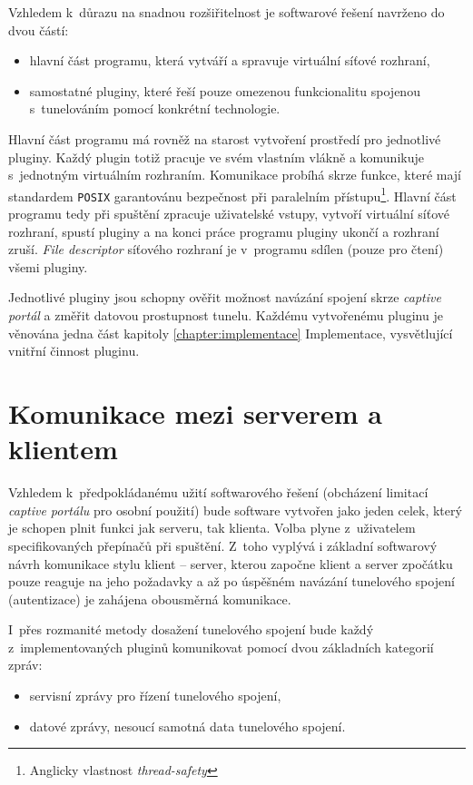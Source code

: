 \documentclass[thesis=M,czech]{FITthesis}[2012/10/20]
\begin{document}
Vzhledem k~důrazu na snadnou rozšiřitelnost je softwarové řešení navrženo do dvou částí:

\begin{itemize}
 \item hlavní část programu, která vytváří a spravuje virtuální síťové rozhraní,
 \item samostatné pluginy, které řeší pouze omezenou funkcionalitu spojenou s~tunelováním pomocí konkrétní technologie.
\end{itemize}

Hlavní část programu má rovněž na starost vytvoření prostředí pro jednotlivé pluginy. Každý plugin totiž pracuje ve svém vlastním vlákně a komunikuje s~jednotným virtuálním rozhraním. Komunikace probíhá skrze funkce, které mají standardem \texttt{POSIX} garantovánu bezpečnost při paralelním přístupu\footnote{Anglicky vlastnost \textit{thread-safety}}. Hlavní část programu tedy při spuštění zpracuje uživatelské vstupy, vytvoří virtuální síťové rozhraní, spustí pluginy a na konci práce programu pluginy ukončí a rozhraní zruší. \textit{File descriptor} síťového rozhraní je v~programu sdílen (pouze pro čtení) všemi pluginy.

Jednotlivé pluginy jsou schopny ověřit možnost navázání spojení skrze \textit{captive portál} a změřit datovou prostupnost tunelu. Každému vytvořenému pluginu je věnována jedna část kapitoly \ref{chapter:implementace} Implementace, vysvětlující vnitřní činnost pluginu.

\section{Komunikace mezi serverem a klientem}

Vzhledem k~předpokládanému užití softwarového řešení (obcházení limitací \textit{captive portálu} pro osobní použití) bude software vytvořen jako jeden celek, který je schopen plnit funkci jak serveru, tak klienta. Volba plyne z~uživatelem specifikovaných přepínačů při spuštění. Z~toho vyplývá i základní softwarový návrh komunikace stylu klient -- server, kterou započne klient a server zpočátku pouze reaguje na jeho požadavky a až po úspěšném navázání tunelového spojení (autentizace) je zahájena obousměrná komunikace.

I~přes rozmanité metody dosažení tunelového spojení bude každý z~implementovaných pluginů komunikovat pomocí dvou základních kategorií zpráv:
\begin{itemize}
 \item servisní zprávy pro řízení tunelového spojení,
 \item datové zprávy, nesoucí samotná data tunelového spojení.
\end{itemize}
 
\end{document}
